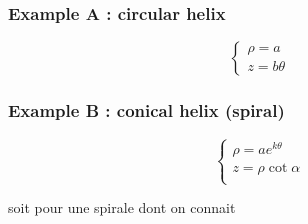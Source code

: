 \subsubsection{Example A : circular helix}
\begin{equation}
	\left\{
	\begin{array}{c}
		\rho = a\\
		z = b\theta
	\end{array}\right.
\end{equation}

\subsubsection{Example B : conical helix (spiral)}
\begin{equation}
	\left\{
	\begin{array}{c}
		\rho = a e^{k\theta}\\
		z = \rho \cot{\alpha}\\
	\end{array}\right.
\end{equation}


soit pour une spirale dont on connait 

